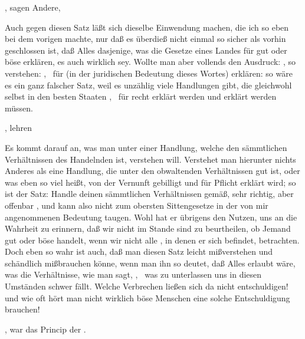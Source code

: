 \begin{aufza}\setcounter{enumi}{6}
\item {}, sagen Andere, 
\end{aufza}\par
Auch gegen diesen Satz läßt sich dieselbe Einwendung machen, die ich so eben bei dem vorigen machte, nur daß es überdieß nicht einmal so sicher als vorhin geschlossen ist, daß Alles dasjenige, was die Gesetze eines Landes für gut oder böse erklären, es auch wirklich sey. Wollte man aber vollends den Ausdruck: , so verstehen: , \dh\ für  (in der juridischen Bedeutung dieses Wortes) erklären: so wäre es ein ganz falscher Satz, weil es unzählig viele  Handlungen gibt, die gleichwohl selbst in den besten Staaten , \dh\ für recht erklärt werden und erklärt werden müssen. 
\begin{aufza}\setcounter{enumi}{7}
\item {}, lehren  \uA
\end{aufza}\par
Es kommt darauf an, was man unter einer Handlung, welche den sämmtlichen Verhältnissen des Handelnden  ist, verstehen will. Verstehet man hierunter nichts Anderes als eine Handlung, die unter den obwaltenden Verhältnissen gut ist, oder was eben so viel heißt, von der Vernunft gebilligt und für Pflicht erklärt wird; so ist der Satz: Handle deinen sämmtlichen Verhältnissen gemäß, sehr richtig, aber offenbar , und kann also nicht zum obersten Sittengesetze in der von mir angenommenen Bedeutung taugen. Wohl hat er übrigens den Nutzen, uns an die Wahrheit zu erinnern, daß wir nicht im Stande sind zu beurtheilen, ob Jemand gut oder böse handelt, wenn wir nicht alle , in denen er sich befindet, betrachten. Doch eben so wahr ist auch, daß man diesen Satz leicht mißverstehen und schändlich mißbrauchen könne, wenn man ihn so deutet, daß Alles erlaubt wäre, was die Verhältnisse, wie man sagt, , \dh\ was zu unterlassen uns in diesen Umständen schwer fällt. Welche Verbrechen ließen sich da nicht entschuldigen! und wie oft hört man nicht wirklich böse Menschen eine solche Entschuldigung brauchen!
\begin{aufza}\setcounter{enumi}{8}
\item {}, war das Princip der .~
\end{aufza}\par
